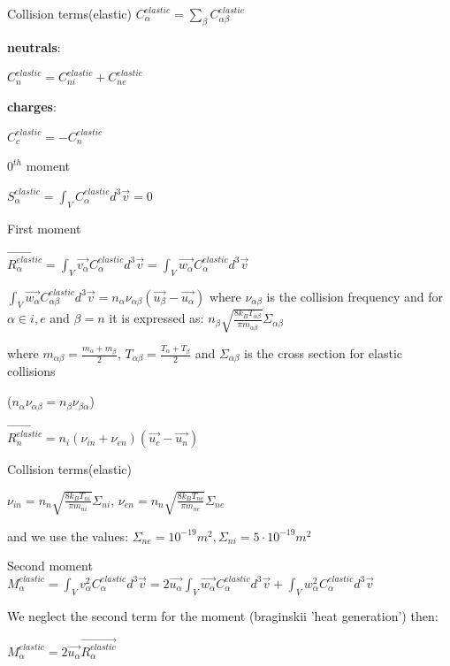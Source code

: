 \documentclass{beamer}
\begin{document}
\begin{frame}{Collision terms(elastic)}
$C_{\alpha}^{elastic} = \sum_{\beta} C_{\alpha \beta}^{elastic}$

\textbf{neutrals}:

$C_{n}^{elastic} =  C_{ni}^{elastic}  + C_{ne}^{elastic}$

\textbf{charges}:

$C_{c}^{elastic} =  -C_{n}^{elastic} $

{\color{red} $0^{th}$ moment}

$S_\alpha^{elastic} = \int_V{C_\alpha^{elastic} d^3\vec{v}} = 0 $

{\color{red} First moment}

$\vec{R_\alpha^{elastic} }= \int_V{\vec{v_\alpha} C_\alpha^{elastic} d^3\vec{v}} = \int_V{\vec{w_\alpha} C_\alpha^{elastic} d^3\vec{v}}  $


$\int_V{\vec{w_\alpha} C_{\alpha\beta}^{elastic} d^3\vec{v}}  = n_\alpha \nu_{\alpha\beta} (\vec{u_\beta} - \vec{u_\alpha})$ where $\nu_{\alpha\beta}$ is the collision frequency and 
for  $\alpha \in i,e$ and $\beta=n$ it is expressed as:  $n_\beta \sqrt{\frac{8 k_B T_{\alpha\beta}}{\pi m_{\alpha\beta } }} \Sigma_{\alpha\beta} $

where  $m_{\alpha\beta} = \frac{m_\alpha + m_\beta}{2}$, $T_{\alpha\beta}= \frac{T_\alpha+T_\beta}{2}$ and $\Sigma_{\alpha\beta}$ is the cross section for elastic collisions

($n_\alpha \nu_{\alpha\beta} = n_\beta \nu_{\beta\alpha} $)

$\vec{R_n^{elastic}} =  n_i (\nu_{in} + \nu_{en})  (\vec{u_c} - \vec{u_n})$

\end{frame}

\begin{frame}{Collision terms(elastic)}

$\nu_{in} =n_n \sqrt{\frac{8 k_B T_{ni}}{\pi m_{ni } }} \Sigma_{ni} $, $\nu_{en} = n_n \sqrt{\frac{8 k_B T_{ne}}{\pi m_{ne } }} \Sigma_{ne}$ 

and we use the values: $\Sigma_{ne} = 10^{-19} m^2, \Sigma_{ni} = 5 \cdot 10^{-19} m^2$

{\color{red} Second moment}
$M_\alpha^{elastic} = \int_V{v_\alpha^2 C_\alpha^{elastic} d^3\vec{v}} = 2 \vec{u_\alpha} \int_V{\vec{w_\alpha} C_\alpha^{elastic} d^3\vec{v}} + \int_V{w_\alpha^2 C_\alpha^{elastic} d^3\vec{v}}  $

We neglect the second term for the moment (braginskii 'heat generation') then:

$M_\alpha^{elastic} = 2 \vec{u_\alpha} \vec{R_\alpha^{elastic}}$ 

\end{frame}
\end{document}
